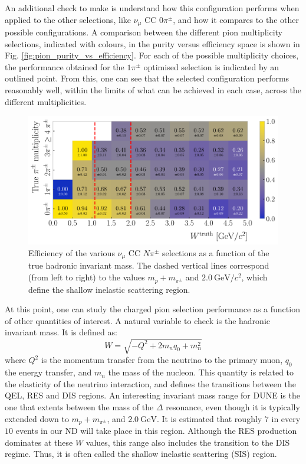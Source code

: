 An additional check to make is understand how this configuration performs when applied to the other selections, like $\nu_{\mu}$ CC $0\pi^{\pm}$, and how it compares to the other possible configurations. A comparison between the different pion multiplicity selections, indicated with colours, in the purity versus efficiency space is shown in Fig. \ref{fig:pion_purity_vs_efficiency}. For each of the possible multiplicity choices, the performance obtained for the $1\pi^{\pm}$ optimised selection is indicated by an outlined point. From this, one can see that the selected configuration performs reasonably well, within the limits of what can be achieved in each case, across the different multiplicities.

\begin{figure}[t]
    \centering
    \includegraphics[width=.90\linewidth]{Images/GAr_selection/pion_selection_efficiency_versus_invariant_mass.pdf}
    \caption[Efficiency of the $\nu_{\mu}$ CC $N\pi^{\pm}$ selections as a function of the hadronic invariant mass.]{Efficiency of the various $\nu_{\mu}$ CC $N\pi^{\pm}$ selections as a function of the true hadronic invariant mass. The dashed vertical lines correspond (from left to right) to the values $m_{p}+m_{\pi^{\pm}}$ and $2.0~\mathrm{GeV}/c^{2}$, which define the shallow inelastic scattering region.}
    \label{fig:efficiency_vs_invariant_mass}
\end{figure}

At this point, one can study the charged pion selection performance as a function of other quantities of interest. A natural variable to check is the hadronic invariant mass. It is defined as:
\begin{equation}
W = \sqrt{-Q^{2} + 2 m_{n} q_{0} + m_{n}^{2}}
\end{equation}
where $Q^{2}$ is the momentum transfer from the neutrino to the primary muon, $q_{0}$ the energy transfer, and $m_{n}$ the mass of the nucleon. This quantity is related to the elasticity of the neutrino interaction, and defines the transitions between the QEL, RES and DIS regions. An interesting invariant mass range for DUNE is the one that extents between the mass of the $\Delta$ resonance, even though it is typically extended down to $m_{p}+m_{\pi^{\pm}}$, and $2.0~\mathrm{GeV}$. It is estimated that roughly $7$ in every $10$ events in our ND will take place in this region. Although the RES production dominates at these $W$ values, this range also includes the transition to the DIS regime. Thus, it is often called the shallow inelastic scattering (SIS) region.

